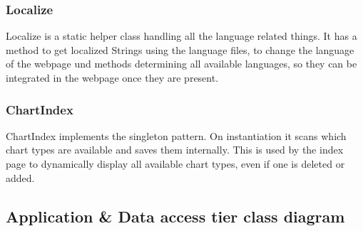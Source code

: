 \subsubsection*{Localize}
Localize is a static helper class handling all the language related things. 
It has a method to get localized Strings using the language files, 
to change the language of the webpage und methods determining all available languages, 
so they can be integrated in the webpage once they are present.

\subsubsection*{ChartIndex}
ChartIndex implements the singleton pattern. On instantiation it scans which chart types are available 
and saves them internally. This is used by the index page to dynamically display all available chart types,
even if one is deleted or added.


\subsection{Application \& Data access tier class diagram}

